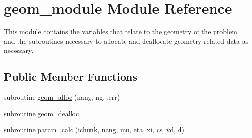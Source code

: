 \hypertarget{classgeom__module}{\section{geom\-\_\-module Module Reference}
\label{classgeom__module}
}


This module contains the variables that relate to the geometry of the problem and the subroutines necessary to allocate and deallocate geometry related data as necessary.  


\subsection*{Public Member Functions}
\begin{DoxyCompactItemize}
\item 
subroutine \hyperlink{classgeom__module_ac4ae76d14c7253c3c87ae0f55b1d4b1a}{geom\-\_\-alloc} (nang, ng, ierr)
\item 
subroutine \hyperlink{classgeom__module_ab2401a2eca471da4ca28fe634b5350d4}{geom\-\_\-dealloc}
\item 
subroutine \hyperlink{classgeom__module_aa09319572e809c686211758ef5fb129e}{param\-\_\-calc} (ichunk, nang, mu, eta, xi, cs, vd, d)
\end{DoxyCompactItemize}
